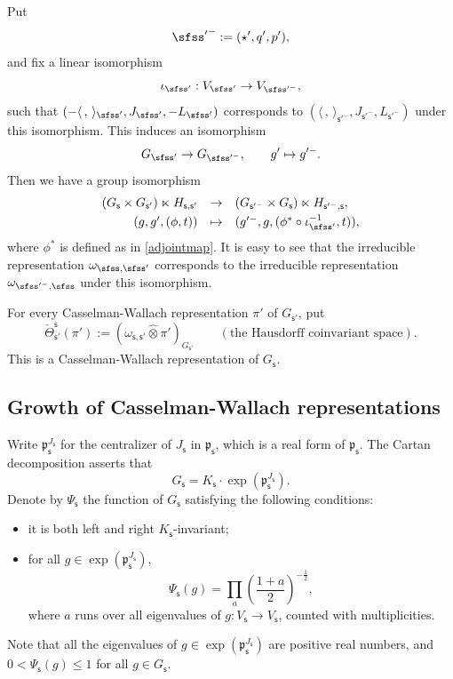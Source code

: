 \documentclass[11pt,a4paper]{amsart}
\newcommand{\p}{\mathfrak p}
\newcommand{\la}{\langle}
\newcommand{\ra}{\rangle}
\newcommand{\be}{\begin {equation}}
\newcommand{\ee}{\end {equation}}
\numberwithin{equation}{section}
\theoremstyle{remark}
\begin{document}
Put
\[
   {\sfss'}^-:=(\star', q', p'),
\]
and fix a linear isomorphism
\be\label{iota0}
 \iota_{\sfss'}:  V_{\sfss'}\rightarrow V_{\sfss'^-},
\ee
such that $(-\la\,,\,\ra_{\sfss'}, J_{\sfss'},-L_{\sfss'})$ corresponds to   $(\la\,,\,\ra_{\mathsf s'^-}, J_{\mathsf s'^-}, L_{\mathsf s'^-})$ under this isomorphism.
This induces an isomorphism
\be\label{isoggp}
  G_{\sfss'}\rightarrow G_{\sfss'^-}, \qquad g'\mapsto g'^-.
\ee
Then we have a group isomorphism
\be\label{identifyjg}
\begin{array}{rcl}
  (G_{\mathsf s}\times G_{\mathsf s'})\ltimes H_{\mathsf s, \mathsf s'}&\rightarrow& (G_{\mathsf s'^-}\times G_{\mathsf s})\ltimes H_{\mathsf s'^-, \mathsf s},\smallskip\\
   (g, g', (\phi, t))&\mapsto & (g'^-, g, (\phi^*  \circ \iota_{\sfss'}^{-1}, t)),
   \end{array}
\ee
where $\phi^*$ is defined as in \eqref{adjointmap}.
It is easy to see that the irreducible representation $\omega_{\sfss, \sfss'}$
corresponds to the irreducible representation $\omega_{\sfss'^-, \sfss}$ under this isomorphism.


 For every Casselman-Wallach representation $\pi'$ of $G_{\mathsf s'}$,
put
\[
   \check \Theta_{\mathsf s'}^{\mathsf s}(\pi'):=(\omega_{\mathsf s, \mathsf s'}\widehat \otimes \pi')_{G_{\mathsf s'}} \qquad (\textrm{the  Hausdorff coinvariant space}).
\]
This is a Casselman-Wallach representation of $G_{\mathsf s}$.



\subsection{Growth of Casselman-Wallach representations}

Write $\p_\mathsf s^{J_\mathsf s}$ for the centralizer of $J_\mathsf s$ in $\p_\mathsf s$, which is a real form of $\p_\mathsf s$. The Cartan decomposition asserts that
\[
  G_\mathsf s=K_\mathsf s\cdot \exp(\p_\mathsf s^{J_\mathsf s}).
\]
Denote by  $\Psi_\mathsf s$ the function of $G_\mathsf s$ satisfying the following conditions:
\begin{itemize}
\item it is both left and right $K_\mathsf s$-invariant;
\item for all $g\in \exp(\p_\mathsf s^{J_\mathsf s})$,
\[
  \Psi_\mathsf s(g)=\prod_{a} \left(\frac{1+a}{2}\right)^{-\frac{1}{2}},
\]
 where $a$ runs over all eigenvalues of $g: V_\mathsf s\rightarrow V_\mathsf s$, counted with multiplicities.
\end{itemize}
Note that all the  eigenvalues of $g \in \exp(\p_\mathsf s^{J_\mathsf s})$ are positive real numbers, and  $0<\Psi_\mathsf s(g)\leq 1$ for all $g\in G_\mathsf s$.
\end{document}
